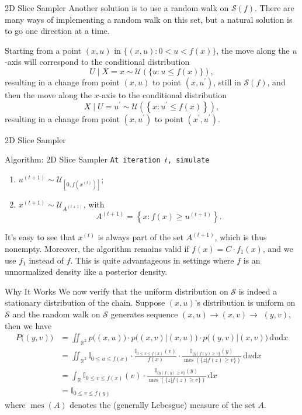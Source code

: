 \documentclass{beamer}
\begin{document}
	\begin{frame}{2D Slice Sampler}
		Another solution is to use a random walk on $\mathscr{S}(f)$. 
		There are many ways of implementing a random walk on this set, but a
		natural solution is to go one direction at a time.
		
		Starting from a point $(x, u)$ in $\{(x, u): 0<u<f(x)\}$, the move along the $u$-axis will correspond to the conditional distribution
		$$
		U \mid X=x \sim \mathcal{U}(\{u: u \leq f(x)\}),
		$$
		resulting in a change from point $(x, u)$ to point $\left(x, u^{\prime}\right)$, still in $\mathscr{S}(f)$, and then the move along the $x$-axis to the conditional distribution
		$$
		X \mid U=u^{\prime} \sim \mathcal{U}\left(\left\{x: u^{\prime} \leq f(x)\right\}\right),
		$$
		resulting in a change from point $\left(x, u^{\prime}\right)$ to point $\left(x^{\prime}, u^{\prime}\right)$.

	\end{frame}
	\begin{frame}{2D Slice Sampler}
		\begin{block}{Algorithm: 2D Slice Sampler}
	\texttt{At iteration $t$, simulate}
	\begin{enumerate}
		\item $u^{(t+1)} \sim \mathcal{U}_{\left[0, f(x^{(t)})\right]}$;
		\item $x^{(t+1)} \sim \mathcal{U}_{A^{(t+1)}}$, with
		$$
		A^{(t+1)}=\left\{x: f(x) \geq u^{(t+1)}\right\}.
		$$
	\end{enumerate}
\end{block}

It's easy to see that $x^{(t)}$ is always part of the set $A^{(t+1)}$, which is thus nonempty. Moreover, the algorithm remains valid if $f(x)=C \cdot f_{1}(x)$, and we use $f_{1}$ instead of $f$. This is quite advantageous in settings where $f$ is an unnormalized density like a posterior density.
	\end{frame}
	\begin{frame}{Why It Works} \small
We now verify that the uniform distribution on $\mathscr{S}$ is indeed a stationary distribution of the chain. Suppose $(x, u)$'s distribution is uniform on $\mathscr{S}$ and the random walk on $\mathscr{S}$ generates sequence $(x, u) \rightarrow(x, v) \rightarrow$ $(y, v)$, then we have
$$
\begin{aligned}
	P\bigl((y, v)\bigr) &=\iint_{\mathbb{R}^2} p\bigl((x, u)\bigr) \cdot p \bigl((x, v)|(x, u)\bigr) \cdot p \bigl((y, v)|(x, v)\bigl) \, \text{d}u\text{d}x \\
	&=\iint_{\mathbb{R}^2} \mathbb{I}_{0 \leq u \leq f(x)} \cdot \frac{\mathbb{I}_{0 \leq v \leq f(x)}(v)}{f(x)} \cdot \frac{\mathbb{I}_{\{y \mid f(y) \geq v\}}(y)}{\operatorname{mes}(\{z|f(z) \geq v\})} \, \text{d}u\text{d}x \\
	&=\int_{\mathbb{R}} \mathbb{I}_{0 \leq v \leq f(x)}(v) \cdot \frac{\mathbb{I}_{\{y \mid f(y) \geq v\}}(y)}{\operatorname{mes}(\{z|f(z) \geq v\})} \,\text{d}x \\
	&=\mathbb{I}_{0 \leq v \leq f(y)}
\end{aligned}
$$
where $\operatorname{mes}(A)$ denotes the (generally Lebesgue) measure of the set $A$.
	\end{frame}
\end{document}
